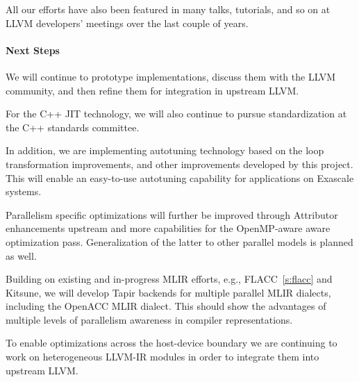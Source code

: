 All our efforts have also been featured in many talks, tutorials, and so on at
LLVM developers' meetings over the last couple of years.

\paragraph{Next Steps}
We will continue to prototype implementations, discuss them with the LLVM
community, and then refine them for integration in upstream LLVM.

For the C++ JIT technology, we will also continue to pursue standardization at
the C++ standards committee.

In addition, we are implementing autotuning technology based on the loop
transformation improvements, and other improvements developed by this project.
This will enable an easy-to-use autotuning capability for applications on
Exascale systems.

Parallelism specific optimizations will further be improved through Attributor
enhancements upstream and more capabilities for the OpenMP-aware aware
optimization pass. Generalization of the latter to other parallel models is
planned as well.

Building on existing and in-progress MLIR efforts, e.g.,
FLACC~\ref{s:flacc} and Kitsune, we will develop Tapir backends for
multiple parallel MLIR dialects, including the OpenACC MLIR dialect.
This should show the advantages of multiple levels of parallelism
awareness in compiler representations.

To enable optimizations across the host-device boundary we are continuing to
work on heterogeneous LLVM-IR modules in order to integrate them into upstream
LLVM.




%
